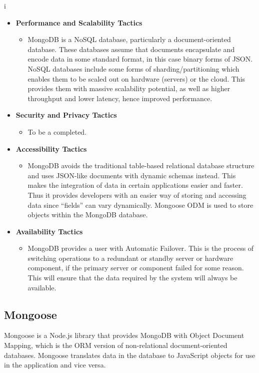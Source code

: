 i\documentclass[a4paper,12pt]{article}
\begin{document}
	\begin{itemize}
		\item\textbf{Performance and Scalability Tactics}
		\begin{itemize}
			\item MongoDB is a NoSQL database, particularly a document-oriented database. These databases assume that documents encapsulate and encode data in some standard format, in this case binary forms of JSON. NoSQL databases include some forms of sharding/partitioning which enables them to be scaled out on hardware (servers) or the cloud. This provides them with massive scalability potential, as well as higher throughput and lower latency, hence improved performance. 
		\end{itemize}
		
		\item\textbf{Security and Privacy Tactics}
		\begin{itemize}
			\item To be a completed.
		\end{itemize}
		
		\item\textbf{Accessibility Tactics}
		\begin{itemize}
			\item MongoDB avoids the traditional table-based relational database structure and uses JSON-like documents with dynamic schemas instead. This makes the integration of data in certain applications easier and faster. Thus it provides developers with an easier way of storing and accessing data since “fields” can vary dynamically. Mongoose ODM is used to store objects within the MongoDB database. 
		\end{itemize}
		
		\item\textbf{Availability Tactics}
		\begin{itemize}
			\item MongoDB provides a user with Automatic Failover. This is the process of switching operations to a redundant or standby server or hardware component, if the primary server or component failed for some reason. This will ensure that the data required by the system will always be available.
		\end{itemize}
	\end{itemize}
	
	\newpage
	\subsection{Mongoose}
	Mongoose is a Node.js library that provides MongoDB with Object Document Mapping, which is the ORM version of non-relational document-oriented databases. Mongoose translates data in the database to JavaScript objects for use in the application and vice versa.
	
\end{document}
